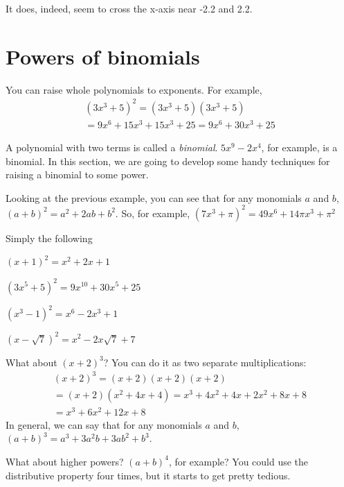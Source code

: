 It does, indeed, seem to cross the x-axis near -2.2 and 2.2.

\section{Powers of binomials}

You can raise whole polynomials to exponents. For example,
\begin{multline*}
  (3x^3 + 5)^2 = (3x^3 + 5)(3x^3 + 5) \\ = 9x^6 + 15x^3 + 15x^3 + 25 = 9x^6 + 30x^3 + 25 
\end{multline*}

A polynomial with two terms is called a \emph{binomial}. $5x^9 - 2x^4$,
for example, is a binomial. In this section, we are going to
develop some handy techniques for raising a binomial to some power.

Looking at the previous example, you can see that for any monomials $a$ and $b$, $(a + b)^2 = a^2 + 2ab + b^2$.
So, for example, $(7x^3 + \pi)^2 = 49x^6 + 14\pi x^3 + \pi^2$

\begin{Exercise}[title={Squaring binomials}, label=squaringbinomials]
  Simply the following
  
\end{Exercise}
\begin{Answer}[ref=squaringbinomials]
  $(x+1)^2 = x^2 + 2x + 1$

  $(3x^5 + 5)^2 = 9x^10 + 30x^5 + 25$

  $(x^3 - 1)^2 = x^6 - 2x^3 + 1$

  $(x - \sqrt{7})^2 = x^2 - 2x\sqrt{7} + 7$
\end{Answer}

What about $(x + 2)^3$? You can do it as two separate multiplications:
\begin{multline*}
  (x+2)^3 = (x+2)(x+2)(x+2) \\
  = (x + 2)(x^2 + 4x + 4) = x^3 + 4x^2 + 4x + 2x^2 + 8x + 8 \\
  = x^3 + 6x^2 + 12x + 8
\end{multline*}
In general, we can say that for any monomials $a$ and $b$, $(a + b)^3 = a^3 + 3a^2b + 3ab^2 + b^3$.

What about higher powers? $(a + b)^4$, for example? You could use the
distributive property four times, but it starts to get pretty tedious.

